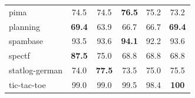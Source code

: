 \begin{table}[t]
\begin{small}
\begin{tabular}{lccccc}
			pima             & 74.5             & 74.5            & \textbf{76.5} & 75.2            & 73.2          \\
			planning         & \textbf{69.4}    & 63.9            & 66.7          & 66.7            & \textbf{69.4} \\
			spambase         & 93.5             & 93.6            & \textbf{94.1} & 92.2            & 93.6          \\
			spectf           & \textbf{87.5}    & 75.0            & 68.8          & 68.8            & 68.8          \\
			statlog-german   & 74.0             & \textbf{77.5}   & 73.5          & 75.0            & 75.5          \\
			tic-tac-toe      & 99.0             & 99.0            & 99.5          & 98.4            & \textbf{100}  \\ \bottomrule
		\end{tabular}
	\end{small}
\end{table}
\setlength{\tabcolsep}{6pt}


